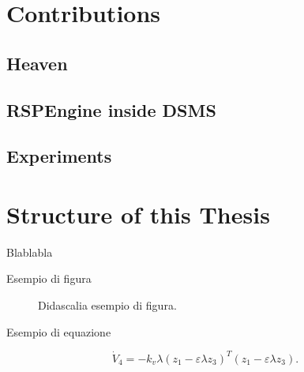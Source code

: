 \section{Contributions}
\subsection{Heaven}
\subsection{RSPEngine inside DSMS}
\subsection{Experiments}

\section{Structure of this Thesis}

Blablabla

Esempio di figura

\begin{figure}[ht]
\caption{Didascalia esempio di figura.}
\label{fig:esempio}
\end{figure}

Esempio di equazione

\begin{equation}
\dot V_4= - k_v \lambda (z_1- \varepsilon \lambda z_3)^T(z_1-
\varepsilon \lambda z_3).
\end{equation}
